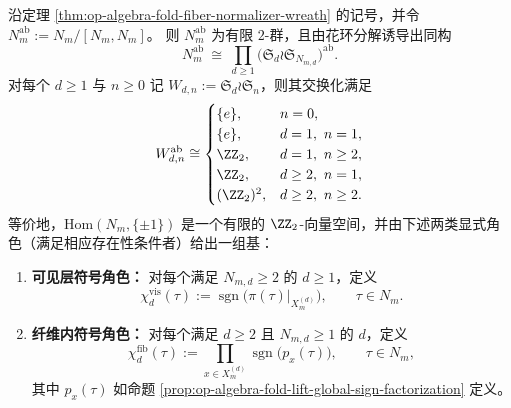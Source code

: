 \begin{theorem}\label{thm:op-algebra-fold-wreath-abelianization-characters}
沿定理 \ref{thm:op-algebra-fold-fiber-normalizer-wreath} 的记号，并令
\(
N_m^{\mathrm{ab}}:=N_m/[N_m,N_m]
\)。
则 \(N_m^{\mathrm{ab}}\) 为有限 \(2\)-群，且由花环分解诱导出同构
\[
N_m^{\mathrm{ab}}
\ \cong\
\prod_{d\ge 1}\bigl(\mathfrak S_d\wr \mathfrak S_{N_{m,d}}\bigr)^{\mathrm{ab}}.
\]
对每个 \(d\ge 1\) 与 \(n\ge 0\) 记 \(W_{d,n}:=\mathfrak S_d\wr \mathfrak S_n\)，则其交换化满足
\begin{equation}\label{eq:op-algebra-wreath-abelianization-cases}
W_{d,n}^{\mathrm{ab}}\cong
\begin{cases}
\{e\}, & n=0,\\
\{e\}, & d=1,\ n=1,\\
\ZZ_2, & d=1,\ n\ge 2,\\
\ZZ_2, & d\ge 2,\ n=1,\\
(\ZZ_2)^2, & d\ge 2,\ n\ge 2.
\end{cases}
\end{equation}
等价地，\(\mathrm{Hom}(N_m,\{\pm1\})\) 是一个有限的 \(\ZZ_2\)-向量空间，并由下述两类显式角色（满足相应存在性条件者）给出一组基：
\begin{enumerate}
  \item \textbf{可见层符号角色：}
  对每个满足 \(N_{m,d}\ge 2\) 的 \(d\ge 1\)，定义
  \[
  \chi^{\mathrm{vis}}_{d}(\tau):=\operatorname{sgn}\bigl(\pi(\tau)|_{X_m^{(d)}}\bigr),
  \qquad \tau\in N_m.
  \]
  \item \textbf{纤维内符号角色：}
  对每个满足 \(d\ge 2\) 且 \(N_{m,d}\ge 1\) 的 \(d\)，定义
  \[
  \chi^{\mathrm{fib}}_{d}(\tau):=\prod_{x\in X_m^{(d)}}\operatorname{sgn}\bigl(p_x(\tau)\bigr),
  \qquad \tau\in N_m,
  \]
  其中 \(p_x(\tau)\) 如命题 \ref{prop:op-algebra-fold-lift-global-sign-factorization} 定义。
\end{enumerate}
\end{theorem}
